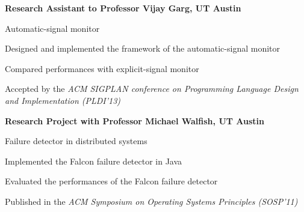 

\begin{myexp}
\item \textbf{Research Assistant to Professor Vijay Garg, UT Austin}   
  \begin{myexp}
    \item Automatic-signal monitor 
     \begin{mybullet}
    \item Designed and implemented the framework of the automatic-signal monitor
    \item Compared performances with explicit-signal monitor
    \item Accepted by the {\it ACM SIGPLAN conference on Programming Language Design and Implementation (PLDI'13)}
    \end{mybullet}
   \end{myexp}
\item {\bf Research Project with Professor Michael Walfish,  UT Austin}     
  \begin{myexp}
    \item Failure detector in distributed systems       \begin{mybullet}
    \item Implemented the Falcon failure detector in Java
    \item Evaluated the performances of the Falcon failure detector
     \item Published in the {\it ACM Symposium on Operating Systems Principles (SOSP'11)}
    \end{mybullet}
    \end{myexp}
 

\end{myexp}
